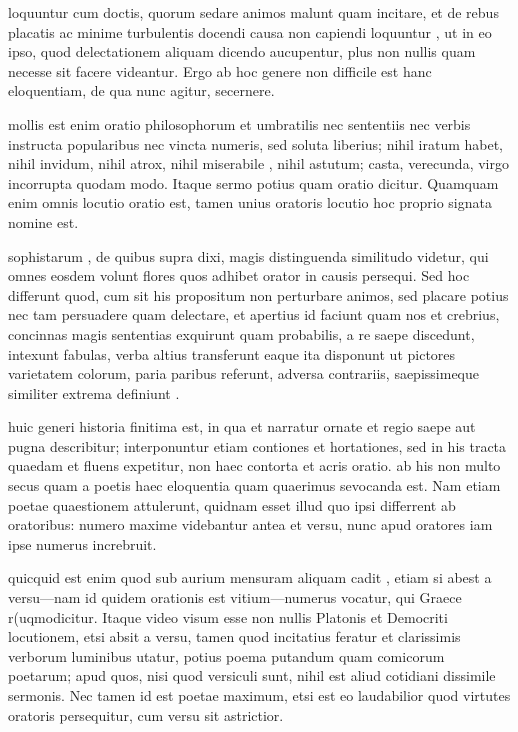  loquuntur cum doctis, quorum sedare animos malunt quam incitare, et de rebus placatis ac minime turbulentis docendi causa non capiendi loquuntur , ut in eo ipso, quod delectationem aliquam dicendo aucupentur, plus non nullis quam necesse sit facere videantur. Ergo ab hoc genere non difficile est hanc eloquentiam, de qua nunc agitur, secernere.

 mollis est enim oratio philosophorum et umbratilis nec sententiis nec verbis instructa popularibus nec vincta numeris, sed soluta liberius; nihil iratum habet, nihil invidum, nihil atrox, nihil miserabile , nihil astutum; casta, verecunda, virgo incorrupta quodam modo. Itaque sermo potius quam oratio dicitur. Quamquam enim omnis locutio oratio est, tamen unius oratoris locutio hoc proprio signata nomine est.

 sophistarum , de quibus supra dixi, magis distinguenda similitudo videtur, qui omnes eosdem volunt flores quos adhibet orator in causis persequi. Sed hoc differunt quod, cum sit his propositum non perturbare animos, sed placare potius nec tam persuadere quam delectare, et apertius id faciunt quam nos et crebrius, concinnas magis sententias exquirunt quam probabilis, a re saepe discedunt, intexunt fabulas, verba altius transferunt eaque ita disponunt ut pictores varietatem colorum, paria paribus referunt, adversa contrariis, saepissimeque similiter extrema definiunt .

 huic generi historia finitima est, in qua et narratur ornate et regio saepe aut pugna describitur; interponuntur etiam contiones et hortationes, sed in his tracta quaedam et fluens expetitur, non haec contorta et acris oratio. ab his non multo secus quam a poetis haec eloquentia quam quaerimus sevocanda est. Nam etiam poetae quaestionem attulerunt, quidnam esset illud quo ipsi differrent ab oratoribus: numero maxime videbantur antea et versu, nunc apud oratores iam ipse numerus increbruit.

 quicquid est enim quod sub aurium mensuram aliquam cadit , etiam si abest a versu—nam id quidem orationis est vitium—numerus vocatur, qui Graece r(uqmo\s dicitur. Itaque video visum esse non nullis Platonis et Democriti locutionem, etsi absit a versu, tamen quod incitatius feratur et clarissimis verborum luminibus utatur, potius poema putandum quam comicorum poetarum; apud quos, nisi quod versiculi sunt, nihil est aliud cotidiani dissimile sermonis. Nec tamen id est poetae maximum, etsi est eo laudabilior quod virtutes oratoris persequitur, cum versu sit astrictior.

